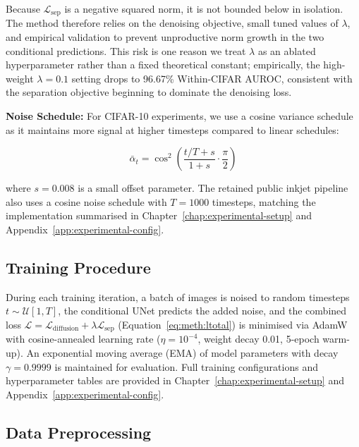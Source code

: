 Because $\mathcal{L}_{\text{sep}}$ is a negative squared norm, it is not bounded below in isolation. The method therefore relies on the denoising objective, small tuned values of $\lambda$, and empirical validation to prevent unproductive norm growth in the two conditional predictions. This risk is one reason we treat $\lambda$ as an ablated hyperparameter rather than a fixed theoretical constant; empirically, the high-weight $\lambda=0.1$ setting drops to 96.67\% Within-CIFAR AUROC, consistent with the separation objective beginning to dominate the denoising loss.

\textbf{Noise Schedule:} For CIFAR-10 experiments, we use a cosine variance schedule as it maintains more signal at higher timesteps compared to linear schedules:

\begin{equation}
\label{eq:meth:cosine_schedule}
\bar{\alpha}_t = \cos^2\!\left( \frac{t/T + s}{1 + s} \cdot \frac{\pi}{2} \right)
\end{equation}

where $s = 0.008$ is a small offset parameter. The retained public inkjet pipeline also uses a cosine noise schedule with $T = 1000$ timesteps, matching the implementation summarised in Chapter~\ref{chap:experimental-setup} and Appendix~\ref{app:experimental-config}.

\subsection{Training Procedure}
\label{sec:meth:training:procedure}

During each training iteration, a batch of images is noised to random timesteps $t \sim \mathcal{U}[1, T]$, the conditional UNet predicts the added noise, and the combined loss $\mathcal{L} = \mathcal{L}_{\text{diffusion}} + \lambda \mathcal{L}_{\text{sep}}$ (Equation~\ref{eq:meth:ltotal}) is minimised via AdamW~\cite{loshchilov2019decoupled} with cosine-annealed learning rate ($\eta = 10^{-4}$, weight decay 0.01, 5-epoch warm-up). An exponential moving average (EMA) of model parameters with decay $\gamma = 0.9999$ is maintained for evaluation. Full training configurations and hyperparameter tables are provided in Chapter~\ref{chap:experimental-setup} and Appendix~\ref{app:experimental-config}.

\subsection{Data Preprocessing}
\label{sec:meth:training:preprocessing}

